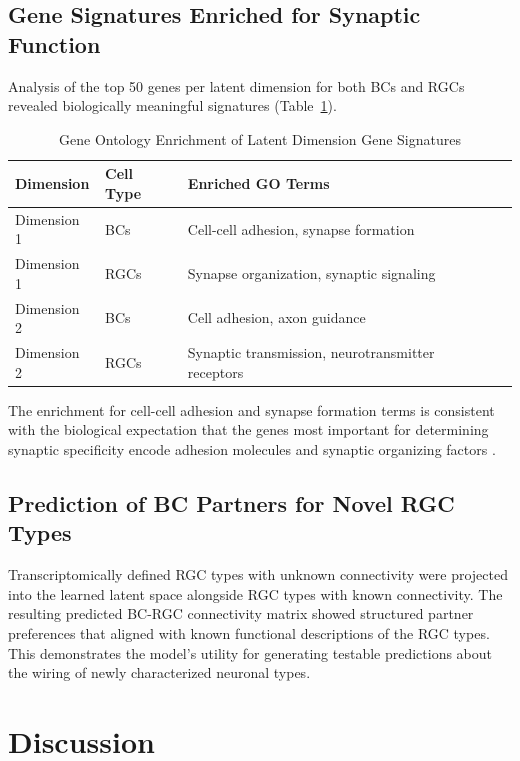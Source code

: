 \documentclass[11pt]{article}
\begin{document}
\subsection{Gene Signatures Enriched for Synaptic Function}

Analysis of the top 50 genes per latent dimension for both BCs and RGCs revealed biologically meaningful signatures (Table~\ref{tab:go}).

\begin{table}[ht]
\centering
\caption{Gene Ontology Enrichment of Latent Dimension Gene Signatures}
\label{tab:go}
\begin{tabular}{llll}
\toprule
\textbf{Dimension} & \textbf{Cell Type} & \textbf{Enriched GO Terms} \\
\midrule
Dimension 1 & BCs & Cell-cell adhesion, synapse formation \\
Dimension 1 & RGCs & Synapse organization, synaptic signaling \\
Dimension 2 & BCs & Cell adhesion, axon guidance \\
Dimension 2 & RGCs & Synaptic transmission, neurotransmitter receptors \\
\bottomrule
\end{tabular}
\end{table}

The enrichment for cell-cell adhesion and synapse formation terms is consistent with the biological expectation that the genes most important for determining synaptic specificity encode adhesion molecules and synaptic organizing factors \citep{sanes2015synaptic, washbourne2004cell}.

\subsection{Prediction of BC Partners for Novel RGC Types}

Transcriptomically defined RGC types with unknown connectivity \citep{tran2019single} were projected into the learned latent space alongside RGC types with known connectivity. The resulting predicted BC-RGC connectivity matrix showed structured partner preferences that aligned with known functional descriptions of the RGC types. This demonstrates the model's utility for generating testable predictions about the wiring of newly characterized neuronal types.

\section{Discussion}
\end{document}
